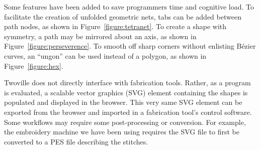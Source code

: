 Some features have been added to save programmers time and cognitive load. To facilitate the creation of unfolded geometric nets, tabs can be added between path nodes, as shown in Figure~\ref{figure:tetranet}. To create a shape with symmetry, a path may be mirrored about an axis, as shown in Figure~\ref{figure:perseverence}. To smooth off sharp corners without enlisting B\'{e}zier curves, an ``ungon'' can be used instead of a polygon, as shown in Figure~\ref{figure:hex}.

Twoville does not directly interface with fabrication tools. Rather, as a program is evaluated, a scalable vector graphics (SVG) element containing the shapes is populated and displayed in the browser. This very same SVG element can be exported from the browser and imported in a fabrication tool's control software. Some workflows may require some post-processing or conversion. For example, the embroidery machine we have been using requires the SVG file to first be converted to a PES file describing the stitches.

